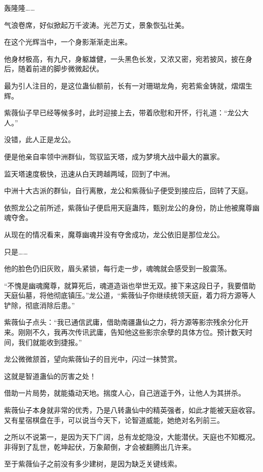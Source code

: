 
\begin{this_body}

轰隆隆……

气浪卷席，好似掀起万千波涛。光芒万丈，景象恢弘壮美。

在这个光辉当中，一个身影渐渐走出来。

他身材极高，有九尺，身躯雄健，一头黑色长发，又浓又密，宛若披风，披在身后，随着前进的脚步微微起伏。

最为引人注目的，是这位蛊仙额前，长有一对珊瑚龙角，宛若紫金铸就，熠熠生辉。

紫薇仙子早已经等候多时，此时迎接上去，带着欣慰和开怀，行礼道：“龙公大人。”

没错，此人正是龙公。

便是他亲自率领中洲群仙，驾驭监天塔，成为梦境大战中最大的赢家。

监天塔速度极快，迅速从白天跨越两域，回到了中洲。

中洲十大古派的群仙，自行离散，龙公和紫薇仙子便受到接应后，回转了天庭。

依照龙公之前所述，紫薇仙子便启用天庭蛊阵，甄别龙公的身份，防止他被魔尊幽魂夺舍。

从现在的情况看来，魔尊幽魂并没有夺舍成功，龙公依旧是那位龙公。

只是……

他的脸色仍旧灰败，眉头紧锁，每行走一步，魂魄就会感受到一股震荡。

“不愧是幽魂魔尊，就算死后，魂道造诣也举世无双。接下来这段日子，我要借助天庭仙墓，将他彻底镇压。”龙公道，“紫薇仙子你继续统领天庭，着力将方源等人铲除，彻底消除后患。”

紫薇仙子点头：“我已通信武庸，借助南疆蛊仙之力，将方源等影宗残余分化开来。刚刚不久，我再次传讯武庸，告知他这些影宗余孽的具体方位。预计数天时间，我们就能收到捷报。”

龙公微微颔首，望向紫薇仙子的目光中，闪过一抹赞赏。

这就是智道蛊仙的厉害之处！

借助一片局势，就能撬动天地。揣度人心，自己逍遥于外，让他人为其拼杀。

紫薇仙子本身就非常的优秀，乃是八转蛊仙中的精英强者，如此才能被天庭收容。又有星宿棋盘在手，可以说当今天下，论智道威能，她绝对名列前三。

之所以不说第一，是因为天下广阔，总有龙蛇隐没，大能潜伏。天庭也不知概况。非得到了乱世，乾坤起伏，万象颠倒，才会被翻腾出几许来。

至于紫薇仙子之前没有多少建树，是因为缺乏关键线索。


\end{this_body}

